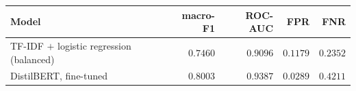 \begin{tabular}{lrrrr}
\toprule
Model & macro-F1 & ROC-AUC & FPR & FNR \\
\midrule
TF-IDF $+$ logistic regression (balanced) & $0.7460$ & $0.9096$ & $0.1179$ & $0.2352$ \\
DistilBERT, fine-tuned & $0.8003$ & $0.9387$ & $0.0289$ & $0.4211$ \\
\bottomrule
\end{tabular}
